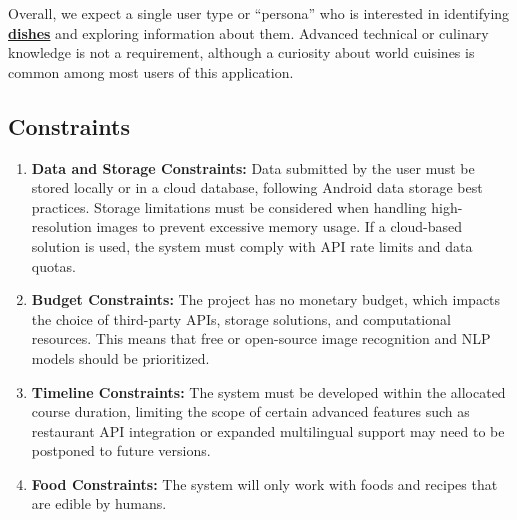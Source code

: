 \documentclass[]{article}
\begin{document}
Overall, we expect a single user type or “persona” who is interested in identifying \hyperref[Dish]{\textbf{dishes}} and exploring information about them. Advanced technical or culinary knowledge is not a requirement, although a curiosity about world cuisines is common among most users of this application.

\subsection{Constraints}
\label{sub:constraints}
\begin{enumerate}
	\item \textbf{Data and Storage Constraints: }Data submitted by the user must be stored locally or in a cloud database, following Android data storage best practices. Storage limitations must be considered when handling high-resolution images to prevent excessive memory usage. If a cloud-based solution is used, the system must comply with API rate limits and data quotas.
	\item \textbf{Budget Constraints: }The project has no monetary budget, which impacts the choice of third-party APIs, storage solutions, and computational resources. This means that free or open-source image recognition and NLP models should be prioritized.
	\item \textbf{Timeline Constraints: }The system must be developed within the allocated course duration, limiting the scope of certain advanced features such as restaurant API integration or expanded multilingual support may need to be postponed to future versions.
	\item \textbf{Food Constraints: } The system will only work with foods and recipes that are edible by humans.
\end{enumerate}
\end{document}

